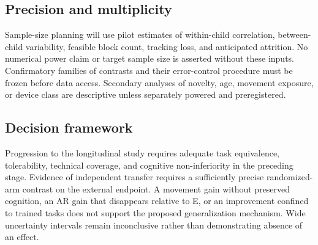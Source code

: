 \subsection{Precision and multiplicity}
Sample-size planning will use pilot estimates of within-child correlation, between-child variability, feasible block count, tracking loss, and anticipated attrition. No numerical power claim or target sample size is asserted without these inputs. Confirmatory families of contrasts and their error-control procedure must be frozen before data access. Secondary analyses of novelty, age, movement exposure, or device class are descriptive unless separately powered and preregistered.

\subsection{Decision framework}
Progression to the longitudinal study requires adequate task equivalence, tolerability, technical coverage, and cognitive non-inferiority in the preceding stage. Evidence of independent transfer requires a sufficiently precise randomized-arm contrast on the external endpoint. A movement gain without preserved cognition, an AR gain that disappears relative to E, or an improvement confined to trained tasks does not support the proposed generalization mechanism. Wide uncertainty intervals remain inconclusive rather than demonstrating absence of an effect.